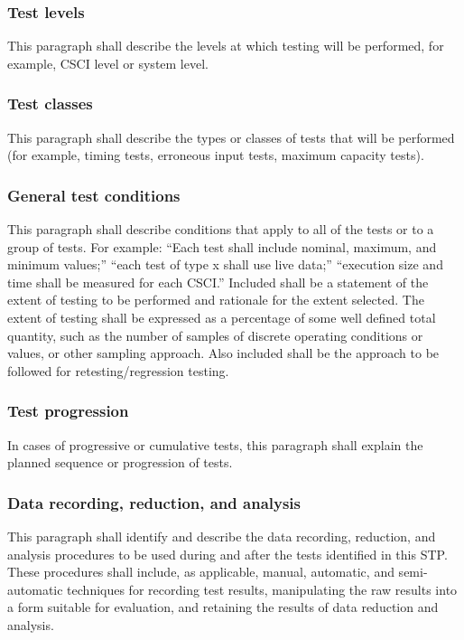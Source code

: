 \documentclass{fidata-report-template}
\begin{document}
\subsubsection{Test levels}

This paragraph shall describe the levels at which testing will be
performed, for example, CSCI level or system level.

\subsubsection{Test classes}

This paragraph shall describe the types or classes of tests that will be
performed (for example, timing tests, erroneous input tests, maximum
capacity tests).

\subsubsection{General test conditions}

This paragraph shall describe conditions that apply to all of the tests
or to a group of tests. For example: ``Each test shall include nominal,
maximum, and minimum values;'' ``each test of type x shall use live
data;'' ``execution size and time shall be measured for each CSCI.''
Included shall be a statement of the extent of testing to be performed
and rationale for the extent selected. The extent of testing shall be
expressed as a percentage of some well defined total quantity, such as
the number of samples of discrete operating conditions or values, or
other sampling approach. Also included shall be the approach to be
followed for retesting/regression testing.

\subsubsection{Test progression}

In cases of progressive or cumulative tests, this paragraph shall
explain the planned sequence or progression of tests.

\subsubsection{Data recording, reduction, and analysis}

This paragraph shall identify and describe the data recording,
reduction, and analysis procedures to be used during and after the tests
identified in this STP. These procedures shall include, as applicable,
manual, automatic, and semi-automatic techniques for recording test
results, manipulating the raw results into a form suitable for
evaluation, and retaining the results of data reduction and analysis.
\end{document}
